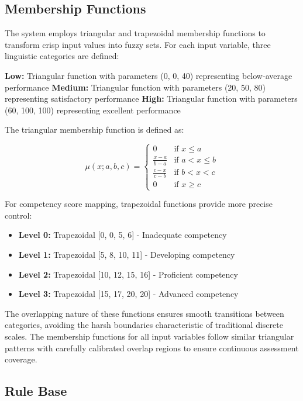 \subsection{Membership Functions}

The system employs triangular and trapezoidal membership functions to transform crisp input values into fuzzy sets. For each input variable, three linguistic categories are defined:

\textbf{Low:} Triangular function with parameters (0, 0, 40) representing below-average performance
\textbf{Medium:} Triangular function with parameters (20, 50, 80) representing satisfactory performance  
\textbf{High:} Triangular function with parameters (60, 100, 100) representing excellent performance

The triangular membership function is defined as:

\begin{equation}
\mu(x; a, b, c) = \begin{cases}
0 & \text{if } x \leq a \\
\frac{x - a}{b - a} & \text{if } a < x \leq b \\
\frac{c - x}{c - b} & \text{if } b < x < c \\
0 & \text{if } x \geq c
\end{cases}
\end{equation}

For competency score mapping, trapezoidal functions provide more precise control:
\begin{itemize}
\item \textbf{Level 0:} Trapezoidal [0, 0, 5, 6] - Inadequate competency
\item \textbf{Level 1:} Trapezoidal [5, 8, 10, 11] - Developing competency  
\item \textbf{Level 2:} Trapezoidal [10, 12, 15, 16] - Proficient competency
\item \textbf{Level 3:} Trapezoidal [15, 17, 20, 20] - Advanced competency
\end{itemize}

The overlapping nature of these functions ensures smooth transitions between categories, avoiding the harsh boundaries characteristic of traditional discrete scales. The membership functions for all input variables follow similar triangular patterns with carefully calibrated overlap regions to ensure continuous assessment coverage.

\subsection{Rule Base}

